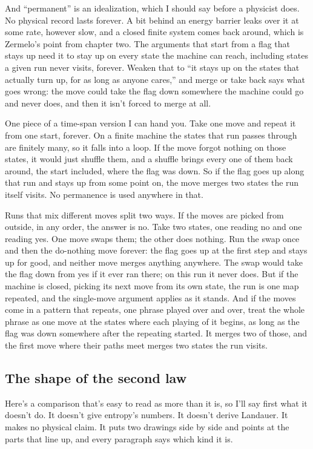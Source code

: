 \documentclass[11pt,twoside]{article}
\theoremstyle{thielethm}
\theoremstyle{thieledef}
\theoremstyle{thieledef}
\theoremstyle{thieledef}
\theoremstyle{thielethm}
\theoremstyle{thieleobs}
\theoremstyle{thielethm}
\begin{document}
And ``permanent'' is an idealization, which I should say before a physicist does. No physical record lasts forever. A bit behind an energy barrier leaks over it at some rate, however slow, and a closed finite system comes back around, which is Zermelo's point from chapter two. The arguments that start from a flag that stays up need it to stay up on every state the machine can reach, including states a given run never visits, forever. Weaken that to ``it stays up on the states that actually turn up, for as long as anyone cares,'' and merge or take back says what goes wrong: the move could take the flag down somewhere the machine could go and never does, and then it isn't forced to merge at all.

One piece of a time-span version I can hand you. Take one move and repeat it from one start, forever. On a finite machine the states that run passes through are finitely many, so it falls into a loop. If the move forgot nothing on those states, it would just shuffle them, and a shuffle brings every one of them back around, the start included, where the flag was down. So if the flag goes up along that run and stays up from some point on, the move merges two states the run itself visits. No permanence is used anywhere in that.

Runs that mix different moves split two ways. If the moves are picked from outside, in any order, the answer is no. Take two states, one reading no and one reading yes. One move swaps them; the other does nothing. Run the swap once and then the do-nothing move forever: the flag goes up at the first step and stays up for good, and neither move merges anything anywhere. The swap would take the flag down from yes if it ever ran there; on this run it never does. But if the machine is closed, picking its next move from its own state, the run is one map repeated, and the single-move argument applies as it stands. And if the moves come in a pattern that repeats, one phrase played over and over, treat the whole phrase as one move at the states where each playing of it begins, as long as the flag was down somewhere after the repeating started. It merges two of those, and the first move where their paths meet merges two states the run visits.

\subsection{The shape of the second law}

Here's a comparison that's easy to read as more than it is, so I'll say first what it doesn't do. It doesn't give entropy's numbers. It doesn't derive Landauer. It makes no physical claim. It puts two drawings side by side and points at the parts that line up, and every paragraph says which kind it is.
\end{document}
